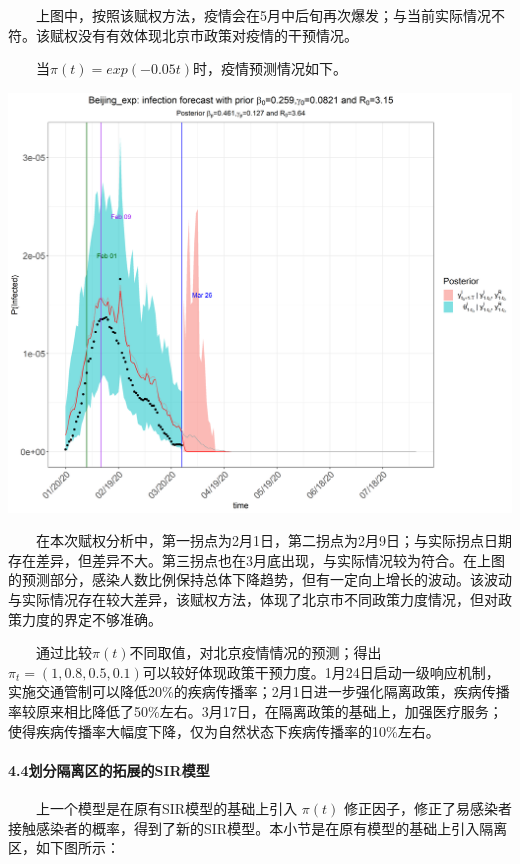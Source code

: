 \documentclass[12pt,a5paper,]{article}
\let\oldparagraph\paragraph
\renewcommand{\paragraph}[1]{\oldparagraph{#1}\mbox{}}
\begin{document}
  上图中，按照该赋权方法，疫情会在5月中后旬再次爆发；与当前实际情况不符。该赋权没有有效体现北京市政策对疫情的干预情况。

  当\(\pi(t)=exp(-0.05t)\)时，疫情预测情况如下。

\includegraphics[width=50in]{figures/infection5}

  在本次赋权分析中，第一拐点为2月1日，第二拐点为2月9日；与实际拐点日期存在差异，但差异不大。第三拐点也在3月底出现，与实际情况较为符合。在上图的预测部分，感染人数比例保持总体下降趋势，但有一定向上增长的波动。该波动与实际情况存在较大差异，该赋权方法，体现了北京市不同政策力度情况，但对政策力度的界定不够准确。

  通过比较\(\pi(t)\)不同取值，对北京疫情情况的预测；得出\(\pi_{t}=(1,0.8,0.5,0.1)\)可以较好体现政策干预力度。1月24日启动一级响应机制，实施交通管制可以降低20\%的疾病传播率；2月1日进一步强化隔离政策，疾病传播率较原来相比降低了50\%左右。3月17日，在隔离政策的基础上，加强医疗服务；使得疾病传播率大幅度下降，仅为自然状态下疾病传播率的10\%左右。

\hypertarget{ux5212ux5206ux9694ux79bbux533aux7684ux62d3ux5c55ux7684sirux6a21ux578b}{%
\paragraph{4.4划分隔离区的拓展的SIR模型}\label{ux5212ux5206ux9694ux79bbux533aux7684ux62d3ux5c55ux7684sirux6a21ux578b}}

  上一个模型是在原有SIR模型的基础上引入 \(\pi(t)\)
修正因子，修正了易感染者接触感染者的概率，得到了新的SIR模型。本小节是在原有模型的基础上引入隔离区，如下图所示：
\end{document}
